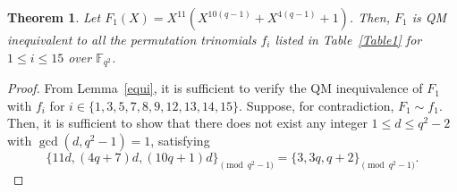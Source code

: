 \documentclass[12pt,reqno]{amsart}
\newtheorem{thm}{Theorem}[section]
\numberwithin{equation}{section}
\theoremstyle{definition}
\newcommand{\F}{\mathbb F}
\begin{document}
\begin{thm}
Let $F_1(X)=X^{11}(X^{10(q-1)} + X^{4(q-1)} + 1)$. Then, $F_1$ is QM inequivalent to all the permutation trinomials $f_i$ listed in Table~\ref{Table1} for $1 \leq i \leq 15$ over $\F_{q^2}$.
\end{thm}
\begin{proof}
From Lemma~\ref{equi}, it is sufficient to verify the QM inequivalence of $F_1$ with $f_i$ for $i \in \{1,3,5,7,8,9,12,13,14,15\}$.  Suppose, for contradiction, $F_{1}\sim f_{1}$. Then, it is sufficient to show that there does not exist any integer $1\leq d\leq q^2-2$ with $\gcd(d,q^2-1)=1$, satisfying 
$$\{11d,(4q+7)d,(10q+1)d\}_{\pmod{q^2-1}}=\{3,3q,q+2\}_{\pmod{q^2-1}}.$$ 

\end{proof}
\end{document}

